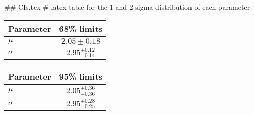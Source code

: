 ## CIs.tex
# latex table for the 1 and 2 sigma distribution of each parameter

\begin{tabular} { l  c}
 Parameter &  68\% limits\\
\hline
{\boldmath$\mu            $} & $2.05\pm 0.18              $\\
{\boldmath$\sigma         $} & $2.95^{+0.12}_{-0.14}      $\\
\hline
\end{tabular}

\begin{tabular} { l  c}
 Parameter &  95\% limits\\
\hline
{\boldmath$\mu            $} & $2.05^{+0.36}_{-0.36}      $\\
{\boldmath$\sigma         $} & $2.95^{+0.28}_{-0.25}      $\\
\hline
\end{tabular}

